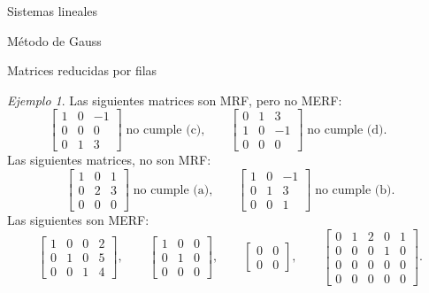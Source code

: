 \documentclass[a4paper,12pt,twoside,spanish,reqno]{amsbook}
\numberwithin{equation}{section}
\theoremstyle{definition}
\theoremstyle{remark}
\newtheorem*{ejemplo*}{Ejemplo}
\begin{document}
\begin{chapter}{Sistemas lineales}
\begin{section}{Método de Gauss }
\begin{subsection}{Matrices reducidas por filas}
                \begin{ejemplo*} Las siguientes matrices son MRF, pero  no MERF:
                    \begin{equation*}
                    \begin{bmatrix}1 & 0& -1 \\  0&0&0\\ 0&1&3 \end{bmatrix}\;  \text{no cumple (c),} \qquad
                    \begin{bmatrix} 0&1&3 \\1 & 0& -1\\  0&0&0 \end{bmatrix}\; \text{no cumple (d).} \qquad
                    \end{equation*}
                    Las siguientes matrices, no son MRF:
                    \begin{equation*}
                    \begin{bmatrix}1 & 0& 1 \\ 0&2&3\\  0&0&0 \end{bmatrix}\; \text{no cumple (a),} \qquad
                    \begin{bmatrix}1 & 0& -1 \\ 0&1&3\\  0&0&1 \end{bmatrix}\; \text{no cumple (b)}. 
                    \end{equation*}
                    Las siguientes son MERF:
                    \begin{equation*}
                    \begin{bmatrix} 1&0&0&2 \\ 0&1&0&5 \\ 0&0&1&4\end{bmatrix}, \qquad
                    \begin{bmatrix} 1&0&0 \\ 0&1&0 \\ 0&0&0\end{bmatrix}, \qquad
                    \begin{bmatrix} 0&0 \\ 0&0\end{bmatrix}, \qquad
                    \begin{bmatrix} 0&1&2&0&1 \\ 0&0&0&1&0 \\ 0&0&0&0&0 \\ 0&0&0&0&0\end{bmatrix}.
                    \end{equation*}
                \end{ejemplo*}
                

\end{subsection}
\end{section}
\end{chapter}
\end{document}
